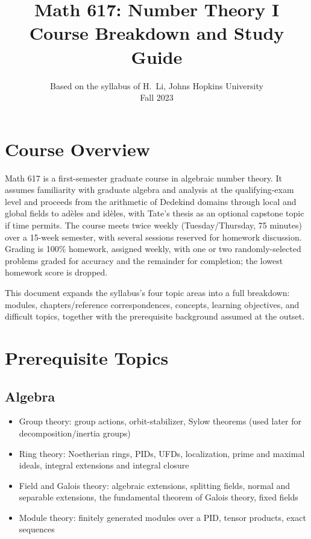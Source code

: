 \documentclass[11pt]{article}
\title{\textbf{Math 617: Number Theory I} \\ \large Course Breakdown and Study Guide}
\author{Based on the syllabus of H.\ Li, Johns Hopkins University \\ Fall 2023}
\date{}
\begin{document}
\maketitle

\section*{Course Overview}
Math 617 is a first-semester graduate course in algebraic number theory. It assumes familiarity with graduate algebra and analysis at the qualifying-exam level and proceeds from the arithmetic of Dedekind domains through local and global fields to adèles and idèles, with Tate's thesis as an optional capstone topic if time permits. The course meets twice weekly (Tuesday/Thursday, 75 minutes) over a 15-week semester, with several sessions reserved for homework discussion. Grading is 100\% homework, assigned weekly, with one or two randomly-selected problems graded for accuracy and the remainder for completion; the lowest homework score is dropped.

This document expands the syllabus's four topic areas into a full breakdown: modules, chapters/reference correspondences, concepts, learning objectives, and difficult topics, together with the prerequisite background assumed at the outset.

\section{Prerequisite Topics}

\subsection{Algebra}
\begin{itemize}[leftmargin=*]
  \item Group theory: group actions, orbit-stabilizer, Sylow theorems (used later for decomposition/inertia groups)
  \item Ring theory: Noetherian rings, PIDs, UFDs, localization, prime and maximal ideals, integral extensions and integral closure
  \item Field and Galois theory: algebraic extensions, splitting fields, normal and separable extensions, the fundamental theorem of Galois theory, fixed fields
  \item Module theory: finitely generated modules over a PID, tensor products, exact sequences
\end{itemize}
\end{document}
